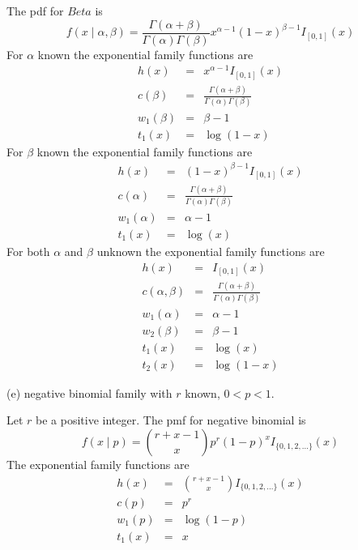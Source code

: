 \bigskip
\noindent
The pdf for $Beta$ is
$$f(x\mid\alpha,\beta)=
\frac{\Gamma(\alpha+\beta)}{\Gamma(\alpha)\Gamma(\beta)}
x^{\alpha-1}(1-x)^{\beta-1}I_{[0,1]}(x)$$
For $\alpha$ known the exponential family functions are
\begin{eqnarray*}
h(x)&=&x^{\alpha-1}I_{[0,1]}(x)\\
c(\beta)&=&
\frac{\Gamma(\alpha+\beta)}{\Gamma(\alpha)\Gamma(\beta)}\\
w_1(\beta)&=&\beta-1\\
t_1(x)&=&\log(1-x)
\end{eqnarray*}
%
For $\beta$ known the exponential
family functions are
\begin{eqnarray*}
h(x)&=&(1-x)^{\beta-1}I_{[0,1]}(x)\\
c(\alpha)&=&
\frac{\Gamma(\alpha+\beta)}{\Gamma(\alpha)\Gamma(\beta)}\\
w_1(\alpha)&=&\alpha-1\\
t_1(x)&=&\log(x)
\end{eqnarray*}
%
For both $\alpha$ and $\beta$ unknown the exponential
family functions are
\begin{eqnarray*}
h(x)&=&I_{[0,1]}(x)\\
c(\alpha,\beta)&=&
\frac{\Gamma(\alpha+\beta)}{\Gamma(\alpha)\Gamma(\beta)}\\
w_1(\alpha)&=&\alpha-1\\
w_2(\beta)&=&\beta-1\\
t_1(x)&=&\log(x)\\
t_2(x)&=&\log(1-x)
\end{eqnarray*}

\bigskip
\noindent
(e) negative binomial family with $r$ known, $0<p<1$.

\bigskip
\noindent
Let $r$ be a positive integer.
The pmf for negative binomial is
$$f(x\mid p)=\binom{r+x-1}{x}p^r(1-p)^xI_{\{0,1,2,\ldots\}}(x)$$
The exponential family functions are
\begin{eqnarray*}
h(x)&=&\binom{r+x-1}{x}I_{\{0,1,2,\ldots\}}(x)\\
c(p)&=&p^r\\
w_1(p)&=&\log(1-p)\\
t_1(x)&=&x
\end{eqnarray*}

